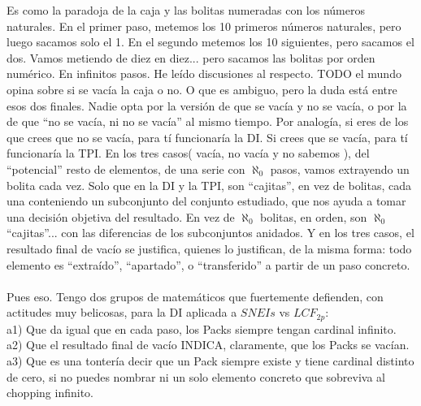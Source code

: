 	\noindent
	Es como la paradoja de la caja y las bolitas numeradas con los números naturales. En el primer paso, metemos los 10 primeros números naturales, pero luego sacamos solo el 1. En el segundo metemos los 10 siguientes, pero sacamos el dos. Vamos metiendo de diez en diez... pero sacamos las bolitas por orden numérico. En infinitos pasos. He leído discusiones al respecto. TODO el mundo opina sobre si se vacía la caja o no. O que es ambiguo, pero la duda está entre esos dos finales. Nadie opta por la versión de que se vacía y no se vacía, o por la de que ``no se vacía, ni no se vacía'' al mismo tiempo. Por analogía, si eres de los que crees que no se vacía, para tí funcionaría la DI. Si crees que se vacía, para tí funcionaría la TPI. En los tres casos( vacía, no vacía y no sabemos ), del ``potencial'' resto de elementos, de una serie con $\aleph_{0}$ pasos, vamos extrayendo un bolita cada vez. Solo que en la DI y la TPI, son ``cajitas'', en vez de bolitas, cada una conteniendo un subconjunto del conjunto estudiado, que nos ayuda a tomar una decisión objetiva del resultado. En vez de $\aleph_{0}$ bolitas, en orden, son $\aleph_{0}$ ``cajitas''... con las diferencias de los subconjuntos anidados. Y en los tres casos, el resultado final de vacío se justifica, quienes lo justifican, de la misma forma: todo elemento es ``extraído'', ``apartado'', o ``transferido'' a partir de un paso concreto.
	\\\\
	
	\noindent
	Pues eso. Tengo dos grupos de matemáticos que fuertemente defienden, con actitudes muy belicosas, para la DI aplicada a $SNEIs$ vs $LCF_{2p}$:\\
	a1) Que da igual que en cada paso, los Packs siempre tengan cardinal infinito.\\
	a2) Que el resultado final de vacío INDICA, claramente, que los Packs se vacían.\\
	a3) Que es una tontería decir que un Pack siempre existe y tiene cardinal distinto de cero, si no puedes nombrar ni un solo elemento concreto que sobreviva al chopping infinito.
	\\\\
	
